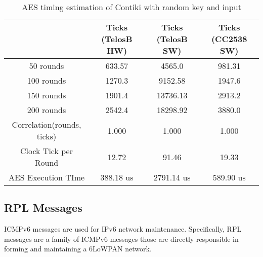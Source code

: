 \begin{table}[ht!]
	\center
	\begin{tabular}{|c|c|c|c|}
	\hline
	                               & Ticks (TelosB HW) & Ticks (TelosB SW) & Ticks (CC2538 SW) \\ \hline
	50 rounds                      & 633.57                  & 4565.0                  & 981.31                  \\ \hline
	100 rounds                     & 1270.3                  & 9152.58                 & 1947.6                  \\ \hline
	150 rounds                     & 1901.4                  & 13736.13                & 2913.2                  \\ \hline
	200 rounds                     & 2542.4                  & 18298.92                & 3880.0                  \\ \hline
	Correlation(rounds, ticks)     & 1.000                   & 1.000                   & 1.000                   \\ \hline
        Clock Tick per Round & 12.72                   & 91.46                   & 19.33                   \\ \hline
	AES Execution TIme   & 388.18 us               & 2791.14 us              & 589.90 us               \\ \hline
	\end{tabular}
	\caption{AES timing estimation of Contiki with random key and input}
	\label{Tbl: AES timing estimation of Contiki with random key and input}
\end{table}
















\subsection{RPL Messages}

ICMPv6 messages are used for IPv6 network maintenance. Specifically, RPL messages are a family of ICMPv6 messages those are directly responsible in forming and maintaining a 6LoWPAN network. 


